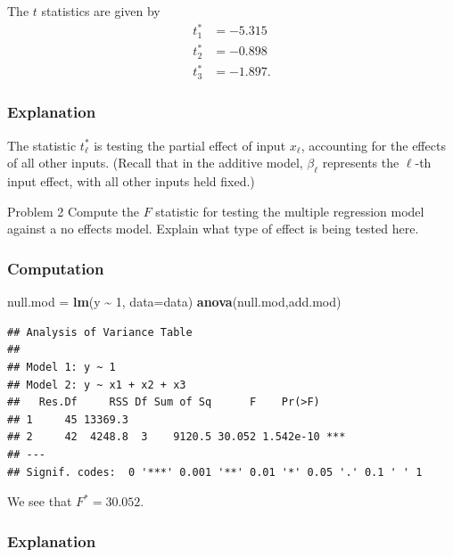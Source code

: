 \documentclass[
]{article}
\newenvironment{Shaded}{\begin{snugshade}}{\end{snugshade}}
\newcommand{\AttributeTok}[1]{\textcolor[rgb]{0.13,0.29,0.53}{#1}}
\newcommand{\DecValTok}[1]{\textcolor[rgb]{0.00,0.00,0.81}{#1}}
\newcommand{\FunctionTok}[1]{\textcolor[rgb]{0.13,0.29,0.53}{\textbf{#1}}}
\newcommand{\NormalTok}[1]{#1}
\newcommand{\OtherTok}[1]{\textcolor[rgb]{0.56,0.35,0.01}{#1}}
\newcommand{\SpecialCharTok}[1]{\textcolor[rgb]{0.81,0.36,0.00}{\textbf{#1}}}
\begin{document}
The \(t\) statistics are given by \begin{align*}
  t_1^* &= -5.315\\
  t_2^* &= -0.898\\
  t_3^* &= -1.897.
\end{align*}

\hypertarget{explanation}{%
\subsubsection{Explanation}\label{explanation}}

The statistic \(t_\ell^*\) is testing the partial effect of input
\(x_\ell\), accounting for the effects of all other inputs. (Recall that
in the additive model, \(\beta_\ell\) represents the \(\ell\)-th input
effect, with all other inputs held fixed.)

\begin{tcolorbox}[split=\f]
Problem 2
\tcblower
Compute the $F$ statistic for testing the multiple regression model against a no
effects model.
Explain what type of effect is being tested here.
\end{tcolorbox}

\hypertarget{computation}{%
\subsubsection{Computation}\label{computation}}

\begin{Shaded}
\begin{Highlighting}[]
\NormalTok{null.mod }\OtherTok{=} \FunctionTok{lm}\NormalTok{(y }\SpecialCharTok{\textasciitilde{}} \DecValTok{1}\NormalTok{, }\AttributeTok{data=}\NormalTok{data)}
\FunctionTok{anova}\NormalTok{(null.mod,add.mod)}
\end{Highlighting}
\end{Shaded}

\begin{verbatim}
## Analysis of Variance Table
## 
## Model 1: y ~ 1
## Model 2: y ~ x1 + x2 + x3
##   Res.Df     RSS Df Sum of Sq      F    Pr(>F)    
## 1     45 13369.3                                  
## 2     42  4248.8  3    9120.5 30.052 1.542e-10 ***
## ---
## Signif. codes:  0 '***' 0.001 '**' 0.01 '*' 0.05 '.' 0.1 ' ' 1
\end{verbatim}

We see that \(F^* = 30.052\).

\hypertarget{explanation-1}{%
\subsubsection{Explanation}\label{explanation-1}}
\end{document}
